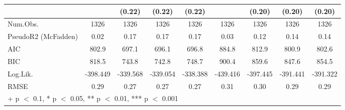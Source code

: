 \begin{table}
\begin{tabular}[t]{lcccccccc}
 &  & (0.22) & (0.22) & (0.22) &  & (0.20) & (0.20) & (0.20)\\
\midrule
Num.Obs. & 1326 & 1326 & 1326 & 1326 & 1326 & 1326 & 1326 & 1326\\
PseudoR2 (McFadden) & 0.02 & 0.17 & 0.17 & 0.17 & 0.03 & 0.12 & 0.14 & 0.14\\
AIC & 802.9 & 697.1 & 696.1 & 696.8 & 884.8 & 812.9 & 800.9 & 802.6\\
BIC & 818.5 & 743.8 & 742.8 & 748.7 & 900.4 & 859.6 & 847.6 & 854.5\\
Log.Lik. & -398.449 & -339.568 & -339.054 & -338.388 & -439.416 & -397.445 & -391.441 & -391.322\\
RMSE & 0.29 & 0.27 & 0.27 & 0.27 & 0.31 & 0.30 & 0.29 & 0.29\\
\bottomrule
\multicolumn{9}{l}{\rule{0pt}{1em}+ p $<$ 0.1, * p $<$ 0.05, ** p $<$ 0.01, *** p $<$ 0.001}\\
\end{tabular}
\end{table}
